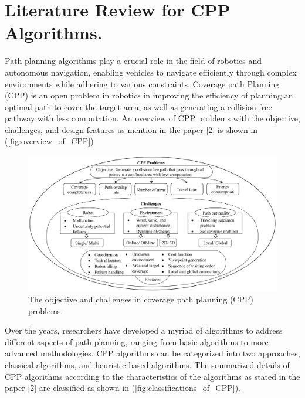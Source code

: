 \section{Literature Review for CPP Algorithms.}


Path planning algorithms play a crucial role in the field of robotics and autonomous navigation, enabling vehicles to navigate efficiently through complex environments while adhering to various constraints. Coverage path Planning (CPP) is an open problem in robotics in improving the efficiency of planning an optimal path to cover the target area, as well as generating a collision-free pathway with less computation. An overview of CPP problems with the objective, challenges, and design features as mention in the paper \hyperlink{cite.main_review}{[2]} is shown in (\autoref{fig:overview_of_CPP})


\begin{figure}[htbp]
    \centering
    \includegraphics[width=\textwidth]{Images/general/overview_of_CPP.png}
    \caption{The objective and challenges in coverage path planning (CPP) problems.}
    \label{fig:overview_of_CPP}
\end{figure}

Over the years, researchers have developed a myriad of algorithms to address different aspects of path planning, ranging from basic algorithms to more advanced methodologies. CPP algorithms can be categorized into two approaches, classical algorithms, and heuristic-based algorithms. The summarized details of CPP algorithms according to the characteristics of the algorithms as stated in the paper \hyperlink{cite.main_review}{[2]} are classified as shown in (\autoref{fig:classifications_of_CPP}). 

